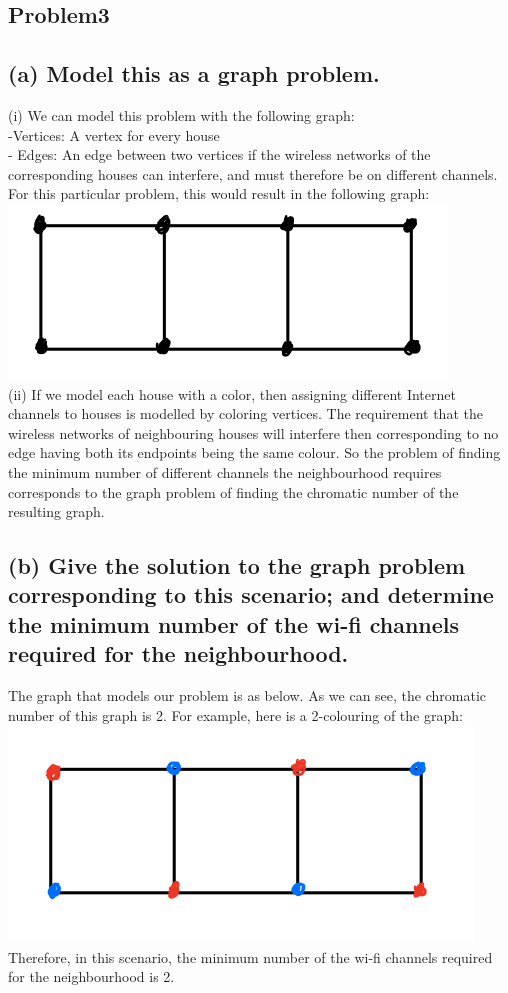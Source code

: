 \documentclass[]{article}
\begin{document}
\begin{spacing}{1.5}
		\section*{Problem3}
		\subsection*{(a) Model this as a graph problem. }
		(i) We can model this problem with the following graph:\\
		-Vertices: A vertex for every house\\
		- Edges: An edge between two vertices if the wireless networks of the corresponding houses can interfere, and must therefore be on different channels.\\
		For this particular problem, this would result in the following graph:\\
		\includegraphics{1}
		~\\
		(ii) If we model each house with a color, then assigning different Internet channels to houses is modelled by coloring vertices. The requirement that the wireless networks of neighbouring houses will interfere then corresponding to no edge having both its endpoints being the same colour. So the problem of finding the minimum number of different channels the neighbourhood requires corresponds to the graph problem of finding the chromatic number of the resulting graph.
		\subsection*{(b) Give the solution to the graph problem corresponding to this scenario; and determine the minimum number of the wi-fi channels required for the neighbourhood.}
		The graph that models our problem is as below. As we can see, the chromatic number of this graph is 2. For example, here is a 2-colouring of the graph:\\
		\includegraphics{2}\\
		Therefore, in this scenario, the minimum number of the wi-fi channels required for the neighbourhood is 2.

\end{spacing}
\end{document}
